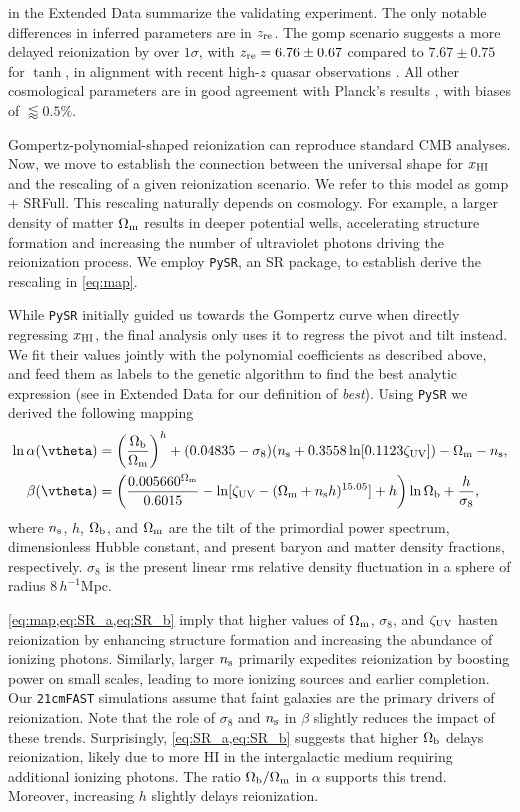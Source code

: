  in the Extended Data summarize the validating
experiment.
The only notable differences in inferred parameters are in $z_{\mathrm{re}}$.
The gomp scenario suggests a more delayed reionization by over
$1\sigma$, with $z_{\mathrm{re}} = 6.76 \pm 0.67$ compared to $7.67 \pm 0.75$ for
$\tanh$, in alignment with recent high-$z$ quasar observations
\cite{Keating2020}.
All other cosmological parameters are in good agreement with Planck's
results \cite{Planck2020a}, with biases of $\lessapprox 0.5 \%$.

Gompertz-polynomial-shaped reionization can reproduce standard CMB analyses.
Now, we move to establish the connection
between the universal shape for $x_{\mathrm{HI}}$ and the rescaling of a given
reionization scenario. We refer to this model as gomp + SRFull.
This rescaling naturally depends on cosmology.
For example, a larger density of matter $\Omega_\mathrm{m}$ results in deeper
potential wells, accelerating structure formation and increasing the
number of ultraviolet photons driving the reionization process.
We employ \texttt{PySR}, an SR package, to establish derive 
the rescaling in \cref{eq:map}.

While \texttt{PySR} initially guided us towards the Gompertz curve when
directly regressing $x_{\mathrm{HI}}$, the final analysis only uses it to regress
the pivot and tilt instead.
We fit their values jointly with the polynomial coefficients as
described above, and feed them as labels to the genetic algorithm to
find the best analytic expression (see  in Extended
Data for our definition of \emph{best}).
Using \texttt{PySR} we derived the following mapping 
%
\begin{align}
\label{eq:SR_a}
\ln\ap(\vtheta) &= \left(\frac{\Omegab}{\Omegam}\right)^h + (0.04835 - \sigma_8) (\ns + 0.3558 \ln[0.1123 \zetaUV])  - \Omegam - \ns, \\
\label{eq:SR_b}
\beta(\vtheta) &=  \left( \frac{0.005660^{\Omegam}}{0.6015} - \ln[\zetaUV - (\Omegam + \ns h)^{15.05} ]+ h \right) \ln{\Omegab} + \frac{h}{\sigma_8},
\end{align} 
where $n_\mathrm{s}$, $h$, $\Omega_\mathrm{b}$, and $\Omega_\mathrm{m}$ are the tilt of the
primordial power spectrum, dimensionless Hubble constant, and present
baryon and matter density fractions, respectively.
$\sigma_8$ is the present linear rms relative density fluctuation in a
sphere of radius $8 \, h^{-1}$Mpc.

\cref{eq:map,eq:SR_a,eq:SR_b} imply that higher values of $\Omega_\mathrm{m}$, $\sigma_8$, 
and $\zeta_\mathrm{UV}$ hasten reionization by enhancing structure
formation and increasing the abundance of ionizing photons. 
Similarly, larger $n_\mathrm{s}$ primarily expedites reionization by boosting
power on small scales, leading to more ionizing 
sources and earlier completion\cite{Montero2021}. Our 
\texttt{21cmFAST} simulations assume that faint galaxies
are the primary drivers of reionization. Note that the role of $\sigma_8$ 
and $n_\mathrm{s}$ in $\beta$ slightly reduces the impact of these trends. 
Surprisingly, \cref{eq:SR_a,eq:SR_b} suggests that higher $\Omega_\mathrm{b}$ delays
reionization, likely due to more HI in the intergalactic medium requiring 
additional ionizing photons. The ratio $\Omega_\mathrm{b}/\Omega_\mathrm{m}$ in $\alpha$ 
supports this trend. Moreover, increasing $h$ slightly delays reionization.

